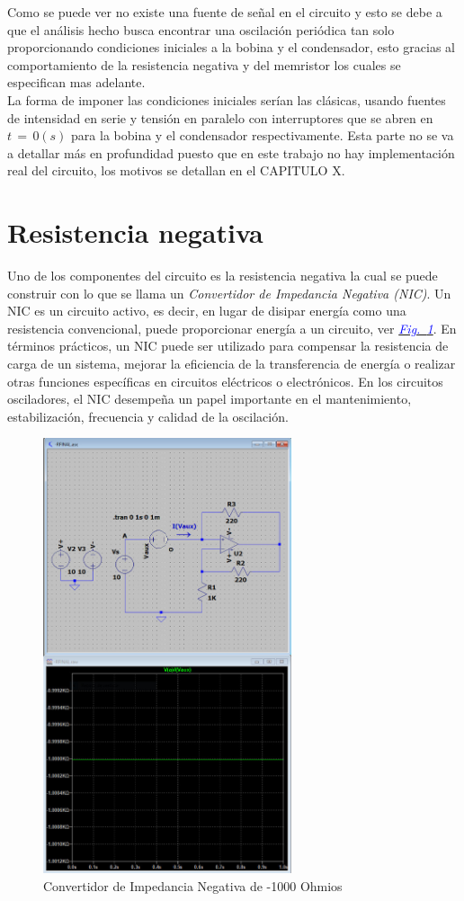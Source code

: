 \documentclass[12pt,a4paper]{report} %
\newcommand{\fref}[1]{\hyperref[#1]{\textcolor{blue}{\textit{Fig.~\ref*{#1}}}}}
\begin{document}
	Como se puede ver no existe una fuente de señal en el circuito y esto se debe a que el análisis hecho busca encontrar una oscilación periódica tan solo proporcionando condiciones iniciales a la bobina y el condensador, esto gracias al comportamiento de la resistencia negativa y del memristor los cuales se especifican mas adelante.\\[0.5cm]
	La forma de imponer las condiciones iniciales serían las clásicas, usando fuentes de intensidad en serie y tensión en paralelo con interruptores que se abren en $t\,=\,0(s)$ para la bobina y el condensador respectivamente. Esta parte no se va a detallar más en profundidad puesto que en este trabajo no hay implementación real del circuito, los motivos se detallan en el CAPITULO X.
	\newpage
	\section{Resistencia negativa}
	Uno de los componentes del circuito es la resistencia negativa la cual se puede construir con lo que se llama un \emph{Convertidor de Impedancia Negativa (NIC)}. Un NIC es un circuito activo, es decir, en lugar de disipar energía como una resistencia convencional, puede proporcionar energía a un circuito, ver \fref{fig:NIC}. En términos prácticos, un NIC puede ser utilizado para compensar la resistencia de carga de un sistema, mejorar la eficiencia de la transferencia de energía o realizar otras funciones específicas en circuitos eléctricos o electrónicos. En los circuitos osciladores, el NIC desempeña un papel importante en el mantenimiento, estabilización, frecuencia y calidad de la oscilación.
	 
	\begin{figure}[h]
		\centering
		\includegraphics[width=0.65\textwidth]{NIC_B.jpg}
		\caption{Convertidor de Impedancia Negativa de -1000 Ohmios}
		\label{fig:NIC}
	\end{figure}
	
\end{document}
